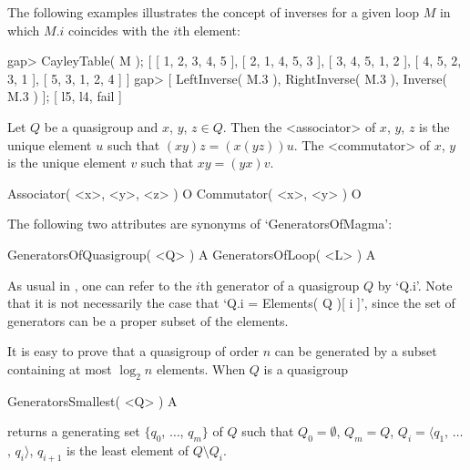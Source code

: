 The following examples illustrates the concept of inverses for a given loop $M$
in which $M$.$i$ coincides with the $i$th element:

\beginexample
gap> CayleyTable( M );
[ [ 1, 2, 3, 4, 5 ],
  [ 2, 1, 4, 5, 3 ],
  [ 3, 4, 5, 1, 2 ],
  [ 4, 5, 2, 3, 1 ],
  [ 5, 3, 1, 2, 4 ] ]
gap> [ LeftInverse( M.3 ), RightInverse( M.3 ), Inverse( M.3 ) ];
[ l5, l4, fail ]
\endexample


Let $Q$ be a quasigroup and $x$, $y$, $z\in Q$. Then the
<associator> of $x$, $y$, $z$ is the unique element $u$ such
that $(xy)z=(x(yz))u$. The <commutator> of $x$, $y$ is the
unique element $v$ such that $xy=(yx)v$.

\>Associator( <x>, <y>, <z> ) O
\>Commutator( <x>, <y> ) O


The following two attributes are synonyms of `GeneratorsOfMagma':

\>GeneratorsOfQuasigroup( <Q> ) A
\>GeneratorsOfLoop( <L> ) A

As usual in {\GAP}, one can refer to the $i$th generator of a quasigroup $Q$ by
`Q.i'. Note that it is not necessarily the case that `Q.i = Elements( Q )[ i
]', since the set of generators can be a proper subset of the elements.

It is easy to prove that a quasigroup of order $n$ can be generated by a subset
containing at most $\log_2{n}$ elements. When $Q$ is a quasigroup

\>GeneratorsSmallest( <Q> ) A

returns a generating set $\{q_0$, $\dots$, $q_m\}$ of $Q$ such that
$Q_0=\emptyset$, $Q_m=Q$, $Q_i=\langle q_1$, $\dots$, $q_i \rangle$, $q_{i+1}$
is the least element of $Q\setminus Q_i$.
